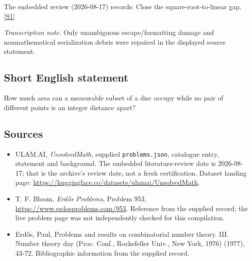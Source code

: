 \documentclass[11pt,a4paper]{article}
\newcommand{\sref}[2]{\hyperlink{source:#1:#2}{[S#2]}}
\begin{document}
The embedded review (2026-08-17) records: Close the square-root-to-linear gap. \sref{statement}{1}

{\small\emph{Transcription note.} Only unambiguous escape/formatting damage and nonmathematical serialization debris were repaired in the displayed source statement.}

\subsection{Short English statement}

How much area can a measurable subset of a disc occupy while no pair of different points is an integer distance apart?

\subsection{Sources}

{\small

\begin{itemize}

\item[\hypertarget{source:statement:1}{S1}] ULAM.AI, \emph{UnsolvedMath}, supplied \texttt{problems.json}, catalogue entry, statement and background. The embedded literature-review date is 2026-08-17; that is the archive’s review date, not a fresh certification. Dataset landing page: \url{https://huggingface.co/datasets/ulamai/UnsolvedMath}.

\item[\hypertarget{source:statement:2}{S2}] T. F. Bloom, \emph{Erdős Problems}, Problem 953, \url{https://www.erdosproblems.com/953}. Reference from the supplied record; the live problem page was not independently checked for this compilation.

\item[\hypertarget{source:statement:3}{S3}] Erd\H{o}s, Paul, Problems and results on combinatorial number theory. III. Number theory day (Proc. Conf., Rockefeller Univ., New York, 1976) (1977), 43-72. Bibliographic information from the supplied record.

\end{itemize}

}

\label{end:statement}
\end{document}

